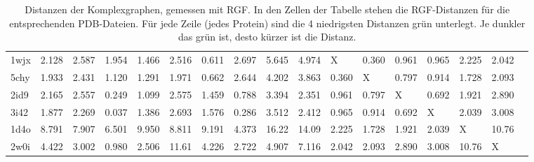 \documentclass{report}
\begin{document}
\begin{table}
{\begin{tabular}{l l l l l l l l l l l l l l l l l}
1wjx & 2.128 & 2.587 & 1.954 & 1.466 & 2.516 & \cellcolor{fGreen!75}0.611 & 2.697 & 5.645 & 4.974 &   X   & \cellcolor{fGreen!100}0.360 & \cellcolor{fGreen!50}0.961 & \cellcolor{fGreen!25}0.965 & 2.225 & 2.042 &  \\
5chy & 1.933 & 2.431 & 1.120 & 1.291 & 1.971 & \cellcolor{fGreen!75}0.662 & 2.644 & 4.202 & 3.863 & \cellcolor{fGreen!100}0.360 &   X   & \cellcolor{fGreen!50}0.797 & \cellcolor{fGreen!25}0.914 & 1.728 & 2.093 &  \\
2id9 & 2.165 & 2.557 & \cellcolor{fGreen!100}0.249 & 1.099 & 2.575 & 1.459 & \cellcolor{fGreen!50}0.788 & 3.394 & 2.351 & 0.961 & \cellcolor{fGreen!25}0.797 &   X   & \cellcolor{fGreen!75}0.692 & 1.921 & 2.890 &  \\
3i42 & 1.877 & 2.269 & \cellcolor{fGreen!100}0.037 & 1.386 & 2.693 & 1.576 & \cellcolor{fGreen!75}0.286 & 3.512 & 2.412 & 0.965 & \cellcolor{fGreen!25}0.914 & \cellcolor{fGreen!50}0.692 &   X   & 2.039 & 3.008 &  \\
1d4o & 8.791 & 7.907 & 6.501 & 9.950 & 8.811 & 9.191 & 4.373 & 16.22 & 14.09 & \cellcolor{fGreen!25}2.225 & \cellcolor{fGreen!100}1.728 & \cellcolor{fGreen!75}1.921 & \cellcolor{fGreen!50}2.039 &   X   & 10.76 &  \\
2w0i & 4.422 & 3.002 & \cellcolor{fGreen!100}0.980 & \cellcolor{fGreen!25}2.506 & 11.61 & 4.226 & 2.722 & 4.907 & 7.116 & \cellcolor{fGreen!75}2.042 & \cellcolor{fGreen!50}2.093 & 2.890 & 3.008 & 10.76 &   X   &  \\



\end{tabular}}
\caption{Distanzen der Komplexgraphen, gemessen mit RGF. In den Zellen der Tabelle stehen die RGF-Distanzen f\"ur die entsprechenden PDB-Dateien. F\"ur jede Zeile (jedes Protein) sind die 4 niedrigsten Distanzen gr\"un unterlegt. Je dunkler das gr\"un ist, desto k\"urzer ist die Distanz.}
\label{table:occ-cg-rgf}
\end{table}



\newpage
\end{document}
